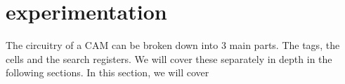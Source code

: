 \section{experimentation}
The circuitry of a CAM can be broken down into 3 main parts. The tags, the cells and the search registers. 
We will cover these separately in depth in the following sections. In this section, we will cover 